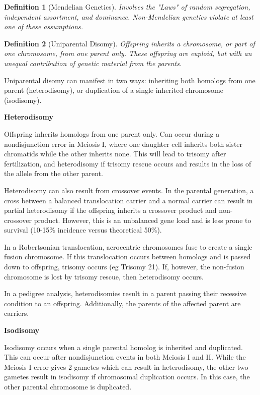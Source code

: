 \documentclass{tufte-handout}
\theoremstyle{noparens}
\newtheorem*{define}{Definition}
\begin{document}
\begin{define}[Mendelian Genetics]
Involves the "Laws" of random segregation, independent assortment, and dominance. Non-Mendelian genetics violate at least one of these assumptions.
\end{define}

\begin{define}[Uniparental Disomy]
Offspring inherits a chromosome, or part of one chromosome, from one parent only. These offspring are euploid, but with an unequal contribution of genetic material from the parents.
\end{define}

Uniparental disomy can manifest in two ways: inheriting both homologs from one parent (heterodisomy), or duplication of a single inherited chromosome (isodisomy).

\textbf{Heterodisomy}

Offspring inherits homologs from one parent only. Can occur during a nondisjunction error in Meiosis I, where one daughter cell inherits both sister chromatids while the other inherits none. This will lead to trisomy after fertilization, and heterodisomy if trisomy rescue occurs and results in the loss of the allele from the other parent.

Heterodisomy can also result from crossover events. In the parental generation, a cross between a balanced translocation carrier and a normal carrier can result in partial heterodisomy if the offspring inherits a crossover product and non-crossover product. However, this is an unbalanced gene load and is less prone to survival (10-15\% incidence versus theoretical 50\%).

In a Robertsonian translocation, acrocentric chromosomes fuse to create a single fusion chromosome. If this translocation occurs between homologs and is passed down to offspring, trisomy occurs (eg Trisomy 21). If, however, the non-fusion chromosome is lost by trisomy rescue, then heterodisomy occurs.

In a pedigree analysis, heterodisomies result in a parent passing their recessive condition to an offspring. Additionally, the parents of the affected parent are carriers. 

\textbf{Isodisomy}

Isodisomy occurs when a single parental homolog is inherited and duplicated. This can occur after nondisjunction events in both Meiosis I and II. While the Meiosis I error gives 2 gametes which can result in heterodisomy, the other two gametes result in isodisomy if chromosomal duplication occurs. In this case, the other parental chromosome is duplicated.
\end{document}
